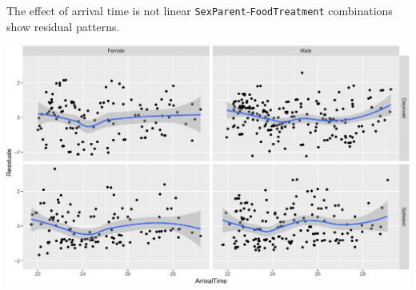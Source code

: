 \documentclass[
  ignorenonframetext,
]{beamer}
\newenvironment{Shaded}{\begin{snugshade}}{\end{snugshade}}
\newcommand{\AttributeTok}[1]{\textcolor[rgb]{0.77,0.63,0.00}{#1}}
\newcommand{\FunctionTok}[1]{\textcolor[rgb]{0.00,0.00,0.00}{#1}}
\newcommand{\NormalTok}[1]{#1}
\newcommand{\OtherTok}[1]{\textcolor[rgb]{0.56,0.35,0.01}{#1}}
\newcommand{\SpecialCharTok}[1]{\textcolor[rgb]{0.00,0.00,0.00}{#1}}
\newcommand{\StringTok}[1]{\textcolor[rgb]{0.31,0.60,0.02}{#1}}
\begin{document}
\begin{frame}[fragile]{The effect of arrival time is not linear}
\protect\hypertarget{the-effect-of-arrival-time-is-not-linear}{}
\texttt{SexParent}-\texttt{FoodTreatment} combinations show residual
patterns.

\scriptsize

\begin{Shaded}
\end{Shaded}

\includegraphics{mixed_models_files/figure-beamer/unnamed-chunk-26-1.pdf}
\end{frame}
\end{document}
